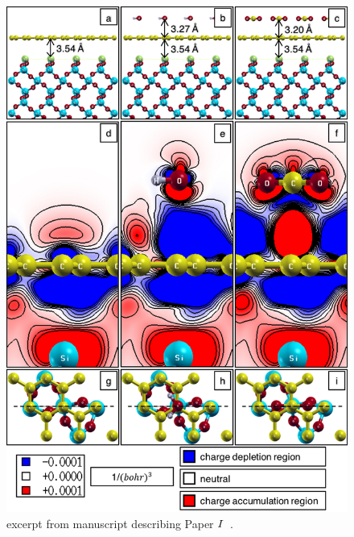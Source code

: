 \begin{figure}
    \centering
    \includegraphics[scale=0.9,keepaspectratio]{Figs/Paper1b.jpg} %
    \caption{excerpt from manuscript describing Paper \hyperref[P1]{$\Rmnum{1}$}~\cite{Elgammal2017}.}
    \label{paper1b}
\end{figure}

